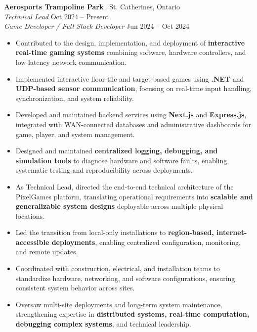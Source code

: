 \documentclass[a4paper,10pt]{article}
\begin{document}
\textbf{Aerosports Trampoline Park} \textbar\ St. Catherines, Ontario \\
\textit{Technical Lead} \hfill Oct 2024 -- Present \\
\textit{Game Developer / Full-Stack Developer} \hfill Jun 2024 -- Oct 2024
\begin{itemize}
    \item Contributed to the design, implementation, and deployment of \textbf{interactive real-time gaming systems} combining software, hardware controllers, and low-latency network communication.
    
    \item Implemented interactive floor-tile and target-based games using \textbf{.NET} and \textbf{UDP-based sensor communication}, focusing on real-time input handling, synchronization, and system reliability.
    
    \item Developed and maintained backend services using \textbf{Next.js} and \textbf{Express.js}, integrated with WAN-connected databases and administrative dashboards for game, player, and system management.
    
    \item Designed and maintained \textbf{centralized logging, debugging, and simulation tools} to diagnose hardware and software faults, enabling systematic testing and reproducibility across deployments.
    
    \item As Technical Lead, directed the end-to-end technical architecture of the PixelGames platform, translating operational requirements into \textbf{scalable and generalizable system designs} deployable across multiple physical locations.
    
    \item Led the transition from local-only installations to \textbf{region-based, internet-accessible deployments}, enabling centralized configuration, monitoring, and remote updates.
    
    \item Coordinated with construction, electrical, and installation teams to standardize hardware, networking, and software configurations, ensuring consistent system behavior across sites.
    
    \item Oversaw multi-site deployments and long-term system maintenance, strengthening expertise in \textbf{distributed systems, real-time computation, debugging complex systems}, and technical leadership.
\end{itemize}
\end{document}
